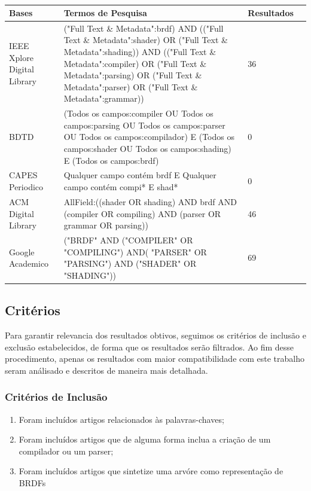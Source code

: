 \documentclass[english, 
               brazil, 
               bsc] %
               {dcomp-abntex2}
\begin{document}
\begin{table}[H]
\ABNTEXfontereduzida
\caption[bases]{}
\label{tab-bases}
\begin{tabular}{p{2.6cm}|p{6.0cm}|p{2.25cm}|p{3.40cm}}
   \textbf{Bases} & \textbf{Termos de Pesquisa}  & \textbf{Resultados}\\
   \hline
    IEEE Xplore Digital Library
    &
    ("Full Text \& Metadata":brdf)
AND (("Full Text \& Metadata":shader) OR  ("Full Text \& Metadata":shading))
AND (("Full Text \& Metadata":compiler) OR  ("Full Text \& Metadata":parsing) OR  ("Full Text \& Metadata":parser) OR  ("Full Text \& Metadata":grammar))
   & 36
    \\ \hline

    BDTD
    & (Todos os campos:compiler OU Todos os campos:parsing OU Todos os campos:parser OU Todos os campos:compilador) E (Todos os campos:shader OU Todos os campos:shading) E (Todos os campos:brdf)
    & 0
    \\ \hline
    CAPES Periodico
    &  Qualquer campo contém brdf E 
 Qualquer campo contém compi* E shad*  
    & 0
    \\ \hline

  ACM Digital Library
  & AllField:((shader OR shading) AND brdf AND (compiler OR compiling) AND (parser OR grammar OR parsing))
  & 46
    \\ \hline

 Google Academico 
  & 
  ("BRDF" AND ("COMPILER" OR "COMPILING") AND( "PARSER" OR "PARSING") AND ("SHADER" OR "SHADING"))
  & 69
\end{tabular}
\end{table}

\subsection{Critérios}

Para garantir relevancia dos resultados obtivos, seguimos os critérios de inclusão e exclusão estabelecidos, de forma que os resultados serão filtrados. Ao fim desse procedimento, apenas os resultados com maior compatibilidade com este trabalho seram análisado e descritos de maneira mais detalhada.

\subsubsection{Critérios de Inclusão}

\begin{enumerate}
  \item Foram incluídos artigos relacionados às palavras-chaves;
  \item Foram incluídos artigos que de alguma forma inclua a criação de um compilador ou um parser;
  \item Foram incluídos artigos que sintetize uma arvóre como representação de BRDFs
\end{enumerate}
\end{document}
